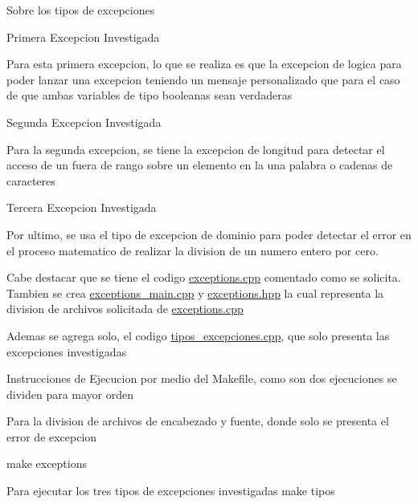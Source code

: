 Sobre los tipos de excepciones

Primera Excepcion Investigada

Para esta primera excepcion, lo que se realiza es que la excepcion de logica para poder lanzar una excepcion teniendo un mensaje personalizado que para el caso de que ambas variables de tipo booleanas sean verdaderas

Segunda Excepcion Investigada

Para la segunda excepcion, se tiene la excepcion de longitud para detectar el acceso de un fuera de rango sobre un elemento en la una palabra o cadenas de caracteres

Tercera Excepcion Investigada

Por ultimo, se usa el tipo de excepcion de dominio para poder detectar el error en el proceso matematico de realizar la division de un numero entero por cero.

Cabe destacar que se tiene el codigo \mbox{\hyperlink{exceptions_8cpp}{exceptions.\+cpp}} comentado como se solicita. Tambien se crea \mbox{\hyperlink{exceptions__main_8cpp}{exceptions\+\_\+main.\+cpp}} y \mbox{\hyperlink{exceptions_8hpp}{exceptions.\+hpp}} la cual representa la division de archivos solicitada de \mbox{\hyperlink{exceptions_8cpp}{exceptions.\+cpp}}

Ademas se agrega solo, el codigo \mbox{\hyperlink{tipos__excepciones_8cpp}{tipos\+\_\+excepciones.\+cpp}}, que solo presenta las excepciones investigadas

Instrucciones de Ejecucion por medio del Makefile, como son dos ejecuciones se dividen para mayor orden

Para la division de archivos de encabezado y fuente, donde solo se presenta el error de excepcion

make exceptions

Para ejecutar los tres tipos de excepciones investigadas make tipos 